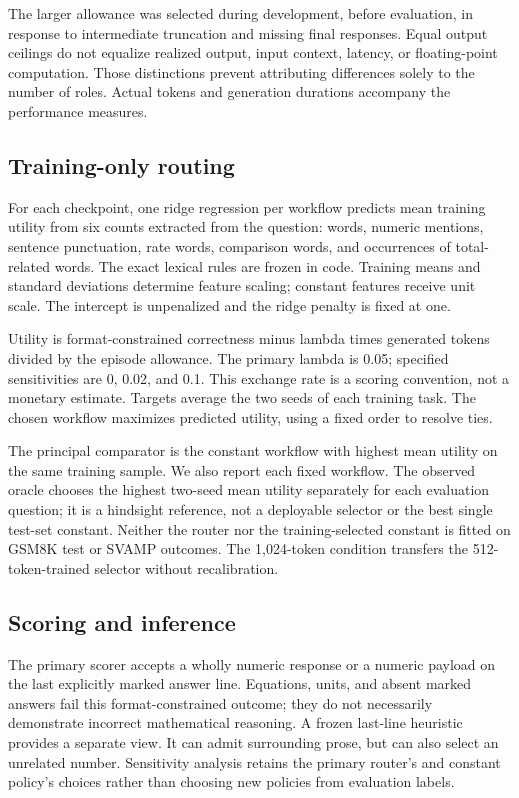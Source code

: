 \documentclass[10pt]{article}
\begin{document}
The larger allowance was selected during development, before evaluation, in response to intermediate truncation and missing final responses. Equal output ceilings do not equalize realized output, input context, latency, or floating-point computation. Those distinctions prevent attributing differences solely to the number of roles. Actual tokens and generation durations accompany the performance measures.

\subsection{Training-only routing}

For each checkpoint, one ridge regression per workflow predicts mean training utility from six counts extracted from the question: words, numeric mentions, sentence punctuation, rate words, comparison words, and occurrences of total-related words. The exact lexical rules are frozen in code. Training means and standard deviations determine feature scaling; constant features receive unit scale. The intercept is unpenalized and the ridge penalty is fixed at one.

Utility is format-constrained correctness minus lambda times generated tokens divided by the episode allowance. The primary lambda is 0.05; specified sensitivities are 0, 0.02, and 0.1. This exchange rate is a scoring convention, not a monetary estimate. Targets average the two seeds of each training task. The chosen workflow maximizes predicted utility, using a fixed order to resolve ties.

The principal comparator is the constant workflow with highest mean utility on the same training sample. We also report each fixed workflow. The observed oracle chooses the highest two-seed mean utility separately for each evaluation question; it is a hindsight reference, not a deployable selector or the best single test-set constant. Neither the router nor the training-selected constant is fitted on GSM8K test or SVAMP outcomes. The 1,024-token condition transfers the 512-token-trained selector without recalibration.

\subsection{Scoring and inference}

The primary scorer accepts a wholly numeric response or a numeric payload on the last explicitly marked answer line. Equations, units, and absent marked answers fail this format-constrained outcome; they do not necessarily demonstrate incorrect mathematical reasoning. A frozen last-line heuristic provides a separate view. It can admit surrounding prose, but can also select an unrelated number. Sensitivity analysis retains the primary router's and constant policy's choices rather than choosing new policies from evaluation labels.
\end{document}
